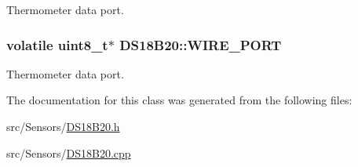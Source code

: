 Thermometer data port. 

\subsubsection[{\texorpdfstring{W\+I\+R\+E\+\_\+\+P\+O\+RT}{WIRE_PORT}}]{\setlength{\rightskip}{0pt plus 5cm}volatile uint8\+\_\+t$\ast$ D\+S18\+B20\+::\+W\+I\+R\+E\+\_\+\+P\+O\+RT\hspace{0.3cm}{\ttfamily [private]}}\hypertarget{classDS18B20_a4e8d420cd118999883bde12e766bc1d4}{}\label{classDS18B20_a4e8d420cd118999883bde12e766bc1d4}


Thermometer data port. 



The documentation for this class was generated from the following files\+:\begin{DoxyCompactItemize}
\item 
src/\+Sensors/\hyperlink{DS18B20_8h}{D\+S18\+B20.\+h}\item 
src/\+Sensors/\hyperlink{DS18B20_8cpp}{D\+S18\+B20.\+cpp}\end{DoxyCompactItemize}
